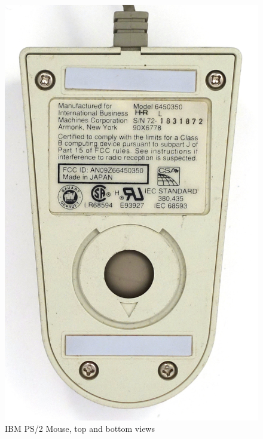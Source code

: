 \documentclass[11pt, a4paper]{article}
\begin{document}
\begin{figure}[h]
    \includegraphics[scale=0.5]{1987_ibm_ps2_mouse/num2.JPG}
    \caption{IBM PS/2 Mouse, top and bottom views}
    \label{fig:IMBPS2TopBottom}
\end{figure}
\end{document}
